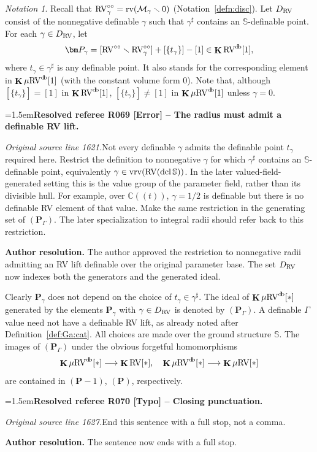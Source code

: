 \documentclass[12pt]{amsart}
\newcommand{\ResolvedRefereeRemark}[5]{%
  \par\medskip\begingroup\normalfont\small\color{gray}%
  \emergencystretch=1.5em\noindent\textbf{Resolved referee R#1 [#2] -- #3.}\par\nobreak\noindent #4\par
  \medskip\color{ResolutionGreen}\noindent\textbf{Author resolution.} #5\par
  \endgroup\medskip
}
\theoremstyle{plain}
\theoremstyle{definition}
\theoremstyle{remark}
\newtheorem{nota}[thm]{Notation}
\numberwithin{equation}{section}
\theoremstyle{plain}
\newcommand{\RV}{\textup{RV}}
\newcommand{\MM}{\mdl M}
\DeclareMathOperator{\dcl}{dcl}
\newcommand{\0}{\emptyset}
\newcommand{\mdl}[1]{\mathcal{#1}}  %
\newcommand{\fun}{\longrightarrow}
\newcommand{\mi}{\smallsetminus}
\newcommand{\mRV}{{\mu}{\RV}}
\newcommand{\mgRV}{{\mu}{\RV}}
\DeclareMathOperator{\rv}{rv}
\DeclareMathOperator{\ggk}{\mathbf{K}}
\DeclareMathOperator{\vrv}{vrv}
\DeclareMathOperator{\db}{d \! b}
\newcommand{\ccirc}{\circ \circ}
\begin{document}
\begin{nota}\label{pgammabis}
Recall that $\RV^{\ccirc}_\gamma = \rv(\MM_{\gamma} \mi 0)$ (Notation~\ref{defn:disc}). Let $D_{\RV}$ consist of the nonnegative definable $\gamma$ such that $\gamma^\sharp$ contains an $\mathbb S$-definable point. For each $\gamma\in D_{\RV}$, let
\[
\bm P_\gamma = [\RV^{\ccirc} \mi \RV^{\ccirc}_{\gamma}] + [\{t_\gamma\}] - [1] \in \ggk \RV^{\db}[1],
\]
where $t_\gamma \in \gamma^\sharp$ is any definable point.  It also stands for the corresponding element  in $\ggk \mRV^{\db}[1]$ (with the constant volume form $0$). Note that, although $[\{t_\gamma\}] = [1]$ in $\ggk \RV^{\db}[1]$,  $[\{t_\gamma\}] \neq [1]$ in $\ggk \mRV^{\db}[1]$  unless $\gamma = 0$.

\ResolvedRefereeRemark{069}{Error}{The radius must admit a definable RV lift}{%
\textit{Original source line 1621.}\quad Not every definable $\gamma$ admits the definable point $t_\gamma$ required here. Restrict the definition to nonnegative $\gamma$ for which $\gamma^\sharp$ contains an $\mathbb S$-definable point, equivalently $\gamma\in\vrv(\RV(\dcl\mathbb S))$. In the later valued-field-generated setting this is the value group of the parameter field, rather than its divisible hull. For example, over $\mathbb C((t))$, $\gamma=1/2$ is definable but there is no definable RV element of that value. Make the same restriction in the generating set of $(\bm P_\Gamma)$. The later specialization to integral radii should refer back to this restriction.
}{The author approved the restriction to nonnegative radii admitting an RV lift definable over the original parameter base. The set $D_{\RV}$ now indexes both the generators and the generated ideal.}

Clearly  $\bm P_\gamma$ does not depend on the choice of $t_\gamma \in \gamma^\sharp$. The ideal of $\ggk \mRV^{\db}[*]$   generated by the elements $\bm P_\gamma$ with $\gamma\in D_{\RV}$ is denoted by $(\bm P_\Gamma)$. A definable $\Gamma$ value need not have a definable RV lift, as already noted after Definition~\ref{def:Ga:cat}. All choices are made over the ground structure $\mathbb S$. The images of $(\bm P_\Gamma)$ under the obvious forgetful homomorphisms
\[
\ggk  \mgRV^{\db}[*] \fun \ggk \RV[*], \quad \ggk  \mgRV^{\db}[*] \fun \ggk  \mgRV[*]
\]
are contained in $(\bm P - 1)$, $(\bm P)$, respectively.

\ResolvedRefereeRemark{070}{Typo}{Closing punctuation}{%
\textit{Original source line 1627.}\quad End this sentence with a full stop, not a comma.
}{The sentence now ends with a full stop.}
\label{review:section4:radius:end}
\end{nota}
\end{document}
